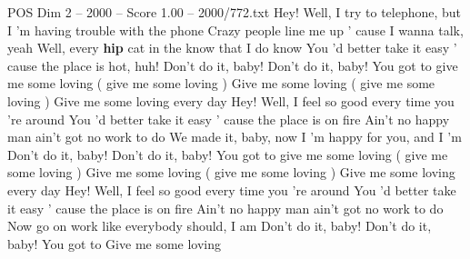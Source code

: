 \begin{textsample}{POS Dim 2 – 2000 – Score 1.00 – 2000/772.txt}  \label{ex:f2_pos_019}
Hey!
Well, I try to telephone, but I 'm having trouble with the phone Crazy people line me up ' cause I wanna talk, yeah Well, every \textbf{hip} cat in the know that I do know You 'd better take it easy ' cause the place is hot, huh!
Don't do it, baby!
Don't do it, baby!
You got to give me some loving ( give me some loving ) Give me some loving ( give me some loving ) Give me some loving every day Hey!
Well, I feel so good every time you 're around You 'd better take it easy ' cause the place is on fire Ain't no happy man ain't got no work to do We made it, baby, now I 'm happy for you, and I 'm Don't do it, baby!
Don't do it, baby!
You got to give me some loving ( give me some loving ) Give me some loving ( give me some loving ) Give me some loving every day Hey!
Well, I feel so good every time you 're around You 'd better take it easy ' cause the place is on fire Ain't no happy man ain't got no work to do Now go on work like everybody should, I am Don't do it, baby!
Don't do it, baby!
You got to Give me some loving

\end{textsample}
